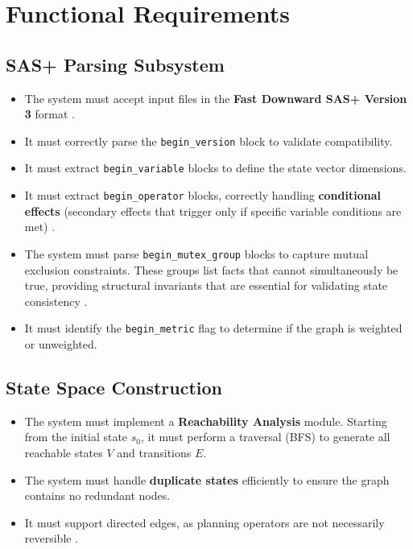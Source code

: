 \documentclass[12pt,a4paper]{report}
\begin{document}
\section{Functional Requirements}

\subsection{SAS+ Parsing Subsystem}
\begin{itemize}
    \item The system must accept input files in the \textbf{Fast Downward SAS+ Version 3} format \cite{fastdownward}.
    \item It must correctly parse the \texttt{begin\_version} block to validate compatibility.
    \item It must extract \texttt{begin\_variable} blocks to define the state vector dimensions.
    \item It must extract \texttt{begin\_operator} blocks, correctly handling \textbf{conditional effects} (secondary effects that trigger only if specific variable conditions are met) \cite{saslexer}.
    \item The system must parse \texttt{begin\_mutex\_group} blocks to capture mutual exclusion constraints. These groups list facts that cannot simultaneously be true, providing structural invariants that are essential for validating state consistency \cite{backstrom93}.
    \item It must identify the \texttt{begin\_metric} flag to determine if the graph is weighted or unweighted.
\end{itemize}

\subsection{State Space Construction}
\begin{itemize}
    \item The system must implement a \textbf{Reachability Analysis} module. Starting from the initial state $s_0$, it must perform a traversal (BFS) to generate all reachable states $V$ and transitions $E$.
    \item The system must handle \textbf{duplicate states} efficiently to ensure the graph contains no redundant nodes.
    \item It must support directed edges, as planning operators are not necessarily reversible \cite{saarland}.
\end{itemize}
\end{document}
